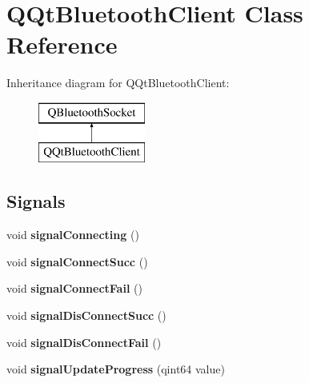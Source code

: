 \hypertarget{class_q_qt_bluetooth_client}{}\section{Q\+Qt\+Bluetooth\+Client Class Reference}
\label{class_q_qt_bluetooth_client}
Inheritance diagram for Q\+Qt\+Bluetooth\+Client\+:\begin{figure}[H]
\begin{center}
\leavevmode
\includegraphics[height=2.000000cm]{class_q_qt_bluetooth_client}
\end{center}
\end{figure}
\subsection*{Signals}
\begin{DoxyCompactItemize}
\item 
\mbox{\label{class_q_qt_bluetooth_client_acacb732471fb5a96ee38f26676ff1cdf}} 
void {\bfseries signal\+Connecting} ()
\item 
\mbox{\label{class_q_qt_bluetooth_client_a4001331240f8e429e6ca8a55922962cf}} 
void {\bfseries signal\+Connect\+Succ} ()
\item 
\mbox{\label{class_q_qt_bluetooth_client_a6e3342b98d344eafb104e6f72b022efd}} 
void {\bfseries signal\+Connect\+Fail} ()
\item 
\mbox{\label{class_q_qt_bluetooth_client_a5c68887915cfe6a23935eda2b59b8596}} 
void {\bfseries signal\+Dis\+Connect\+Succ} ()
\item 
\mbox{\label{class_q_qt_bluetooth_client_afa8484c57643554b5fafdbad630134c5}} 
void {\bfseries signal\+Dis\+Connect\+Fail} ()
\item 
\mbox{\label{class_q_qt_bluetooth_client_aa9503ef22af8aa938a3bab8483231066}} 
void {\bfseries signal\+Update\+Progress} (qint64 value)
\end{DoxyCompactItemize}
